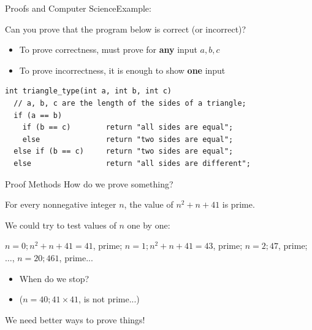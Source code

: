 \begin{frame}[fragile]{Proofs and Computer Science}{Example:}

  Can you prove that the program below is correct (or incorrect)?

  \begin{itemize}
    \item To prove correctness, must prove for {\bf any} input $a,b,c$
    \item To prove incorrectness, it is enough to show {\bf one} input
  \end{itemize}

\begin{verbatim}
int triangle_type(int a, int b, int c)
  // a, b, c are the length of the sides of a triangle;
  if (a == b)
    if (b == c)        return "all sides are equal";
    else               return "two sides are equal";
  else if (b == c)     return "two sides are equal";
  else                 return "all sides are different";
\end{verbatim}
\end{frame}

\begin{frame}[t]{Proof Methods}{}
  How do we prove something?
  \begin{block}{}
    For every nonnegative integer $n$, the value of $n^2+n+41$ is prime.
  \end{block}\medskip

  We could try to test values of $n$ one by one:
  \begin{center}
    $n = 0; n^2+n+41 = 41$, prime; $n = 1; n^2 + n + 41 = 43$, prime; $n = 2; 47$, prime; $\ldots$, $n = 20; 461$, prime...
  \end{center}\medskip

  \begin{itemize}
    \item When do we stop?
    \item ($n = 40; 41\times41$, is not prime...)
  \end{itemize}\bigskip

  We need better ways to prove things!
\end{frame}